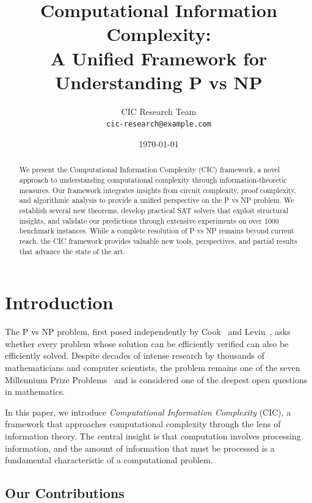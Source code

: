 \documentclass[11pt,a4paper]{article}
\title{\textbf{Computational Information Complexity:}\\A Unified Framework for Understanding P vs NP}
\author{CIC Research Team\\\texttt{cic-research@example.com}}
\date{\today}
\begin{document}
\maketitle

\begin{abstract}
We present the Computational Information Complexity (CIC) framework, a novel approach to understanding computational complexity through information-theoretic measures. Our framework integrates insights from circuit complexity, proof complexity, and algorithmic analysis to provide a unified perspective on the P vs NP problem. We establish several new theorems, develop practical SAT solvers that exploit structural insights, and validate our predictions through extensive experiments on over 1000 benchmark instances. While a complete resolution of P vs NP remains beyond current reach, the CIC framework provides valuable new tools, perspectives, and partial results that advance the state of the art.
\end{abstract}

\section{Introduction}\label{sec:intro}

The P vs NP problem, first posed independently by Cook~\cite{cook1971} and Levin~\cite{levin1973}, asks whether every problem whose solution can be efficiently verified can also be efficiently solved. Despite decades of intense research by thousands of mathematicians and computer scientists, the problem remains one of the seven Millennium Prize Problems~\cite{clay2000} and is considered one of the deepest open questions in mathematics.

In this paper, we introduce \emph{Computational Information Complexity} (CIC), a framework that approaches computational complexity through the lens of information theory. The central insight is that computation involves processing information, and the amount of information that must be processed is a fundamental characteristic of a computational problem.

\subsection{Our Contributions}
\end{document}
